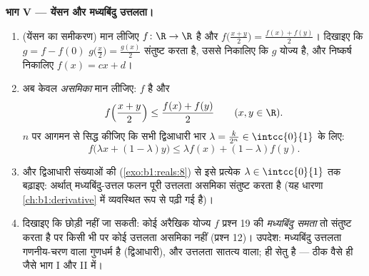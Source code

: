 \begin{problem}[{सप्ताहांत समस्या --- $f(x + y) = f(x) + f(y)$: नियमितता रैखिकता पर बाध्य कर देती है, और राक्षसों
का चित्र}]
\medskip \noindent\textbf{भाग V --- येंसन और मध्यबिंदु उत्तलता।}
\begin{enumerate}[resume]
  \item (येंसन का समीकरण) मान लीजिए $f \colon \R \to \R$  है और
  $f\bigl(\frac{x+y}{2}\bigr) = \frac{f(x) + f(y)}{2}$। दिखाइए कि $g = f -
  f(0)$ $g\bigl(\frac x2\bigr) = \frac{g(x)}{2}$ संतुष्ट करता है, उससे
  निकालिए कि $g$ योज्य है, और निष्कर्ष निकालिए $f(x) = cx + d$।
  \item अब केवल \emph{असमिका} मान लीजिए: $f$  है और
        \[
        f\Bigl(\frac{x + y}{2}\Bigr) \leq \frac{f(x) +
        f(y)}{2} \qquad (x, y \in \R).
        \]
        $n$ पर आगमन से सिद्ध कीजिए कि सभी द्विआधारी भार $\lambda =
        \frac{k}{2^n} \in \intcc{0}{1}$ के लिए:
        \[
        f\bigl(\lambda x + (1 - \lambda)y\bigr) \leq \lambda
        f(x) + (1 - \lambda) f(y) .
        \]
  \item {} और द्विआधारी संख्याओं की  (\cref{exo:b1:reals:8}) से
  इसे प्रत्येक $\lambda \in \intcc{0}{1}$ तक बढ़ाइए: अर्थात् 
  मध्यबिंदु-उत्तल फलन पूरी उत्तलता असमिका संतुष्ट करता है (यह धारणा
  \cref{ch:b1:derivative} में व्यवस्थित रूप से पढ़ी गई है)।
  \item दिखाइए कि  छोड़ी नहीं जा सकती: कोई अरैखिक योज्य $f$ प्रश्न 19
  की \emph{मध्यबिंदु समता} तो संतुष्ट करता है पर किसी भी  पर कोई
  उत्तलता असमिका नहीं (प्रश्न 12)। उपदेश: मध्यबिंदु उत्तलता गणनीय-चरण वाला
  गुणधर्म है (द्विआधारी), और उत्तलता सातत्य वाला;  ही सेतु है --- ठीक
  वैसे ही जैसे भाग I और II में।
\end{enumerate}


\end{problem}
